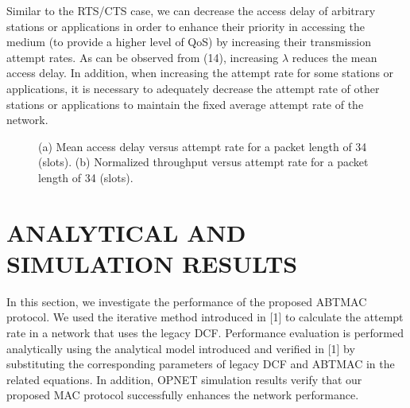 \documentclass[10pt,twocolumn,oneside,submit]{JCNtran}
\begin{document}
\par Similar to the RTS/CTS case, we can decrease the access delay of arbitrary stations or applications in order to enhance their priority in accessing the medium (to provide a higher level of QoS) by increasing their transmission attempt rates. As can be observed from (14), increasing $\lambda$ reduces the mean access delay. In addition, when increasing the attempt rate for some stations or applications, it is necessary to adequately decrease the attempt rate of other stations or applications to maintain the fixed average attempt rate of the network.  
\begin{figure*}[!t]
\begin{center}
\epsfxsize=16cm \leavevmode{} \caption{(a) Mean access delay versus attempt rate for a packet length of 34 (slots). (b) Normalized throughput versus attempt rate for a packet length of 34 (slots).} \label{fig:7}
\end{center}
\end{figure*}
\vspace{10pt}
\section{\uppercase{ANALYTICAL AND SIMULATION RESULTS}}
\label{sec:result}
\par In this section, we investigate the performance of the proposed ABTMAC protocol. We used the iterative method introduced in [1] to calculate the attempt rate in a network that uses the legacy DCF. Performance evaluation is performed analytically using the analytical model introduced and verified in [1] by substituting the corresponding parameters of legacy DCF and ABTMAC in the related equations. In addition, OPNET simulation results verify that our proposed MAC protocol successfully enhances the network performance.
\end{document}
